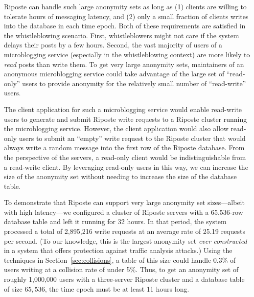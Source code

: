 \documentclass[10pt,twocolumn]{article}
\newcommand{\name}{Riposte\xspace}
\newcommand{\Name}{Riposte\xspace}
\begin{document}
\Name can handle such large anonymity sets as long as
(1) clients are willing to tolerate hours of messaging latency, and 
(2) only a small fraction of clients writes into the database in each time epoch.
Both of these requirements are satisfied in the whistleblowing
scenario.
First, whistleblowers might not care if the system delays their posts by
a few hours.
Second, the vast majority of users of a microblogging service
(especially in the whistleblowing context) are 
more likely to {\em read} posts than write them.
To get very large anonymity sets, maintainers of an anonymous
microblogging service could take advantage of the large set of
``read-only'' users to provide anonymity for the relatively 
small number of ``read-write'' users.

The client application for such a microblogging service would 
enable read-write users to generate and submit
\name write requests to a \name cluster running the microblogging service.
However, the client application would 
also allow read-only users to submit an ``empty''
write request to the \name cluster that would always write a random
message into the first row of the \name database.
From the perspective of the servers, a read-only client would be 
indistinguishable from a read-write client.
By leveraging read-only users in this way, 
we can increase the size of the anonymity set without
needing to increase the size of the database table.

To demonstrate that \name can support very large anonymity set
sizes---albeit with high latency---we configured a cluster
of \name servers with a 65,536-row database table and left it running for 32 hours.
In that period, the system processed a total of 2,895,216 
write requests at an average rate of 25.19 requests per second.
(To our knowledge, this is the largest
anonymity set {\em ever constructed} in a system that
offers protection against traffic analysis attacks.)
Using the techniques in Section~\ref{sec:collisions},
a table of this size could handle 0.3\% of users writing at
a collision rate of under 5\%.
Thus, to get an anonymity set of roughly 1,000,000 users
with a three-server \name cluster and
a database table of size $65,536$, the time epoch must 
be at least 11 hours long.
\end{document}
